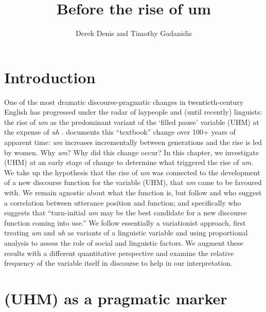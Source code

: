 \documentclass[11pt]{article}
\title{Before the rise of um}
\author{Derek Denis and Timothy Gadanidis}
\begin{document}
\maketitle

\section{Introduction}

One of the most dramatic discourse-pragmatic changes in twentieth-century
English has progressed under the radar of laypeople and (until recently)
linguists: the rise of \emph{um} as the predominant variant of the `filled
pause' variable (UHM) at the expense of \emph{uh} \parencite{tottie2011,
fruehwald2016, wielingetal2016}.
\textcite[43]{fruehwald2016} documents this ``textbook'' change over 100+ years
of apparent time:
\emph{um} increases incrementally between generations and the rise is led by
women.
Why \emph{um}? Why did this change occur?
In this chapter, we investigate (UHM) at an early stage of change to determine
what triggered the rise of \emph{um}.
We take up the hypothesis that the rise of \emph{um} was connected to the
development of a new discourse function for the variable (UHM), that \emph{um}
came to be favoured with.
We remain agnostic about what the function is, but follow \textcite{tottie2016}
and \textcite{fruehwald2016} who suggest a correlation between utterance
position and function; and specifically \textcite[46]{fruehwald2016} who suggests
that ``turn-initial \emph{um} may be the best candidate for a new
discourse function coming into use.''
We follow essentially a variationist approach, first treating \emph{um} and
\emph{uh} as variants of a linguistic variable and using proportional analysis
to assess the role of social and linguistic factors.
We augment these results with a different quantitative perspective and examine
the relative frequency of the variable itself in discourse to help in our
interpretation.

\section{(UHM) as a pragmatic marker}
\end{document}
